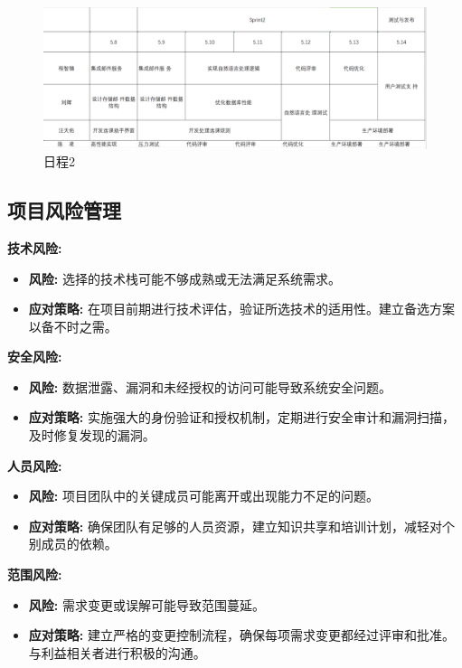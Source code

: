 \documentclass{article}
\begin{document}
	\begin{figure}[h]
	\centering
	\includegraphics[width=\textwidth]{日程2.png}
	\caption{日程2}
	\label{fig:schedule2}
\end{figure}

\subsection{项目风险管理}
\textbf{技术风险:}
\begin{itemize}
    \item \textbf{风险:} 选择的技术栈可能不够成熟或无法满足系统需求。
    \item \textbf{应对策略:} 在项目前期进行技术评估，验证所选技术的适用性。建立备选方案以备不时之需。
\end{itemize}

\textbf{安全风险:}
\begin{itemize}
    \item \textbf{风险:} 数据泄露、漏洞和未经授权的访问可能导致系统安全问题。
    \item \textbf{应对策略:} 实施强大的身份验证和授权机制，定期进行安全审计和漏洞扫描，及时修复发现的漏洞。
\end{itemize}

\textbf{人员风险:}
\begin{itemize}
    \item \textbf{风险:} 项目团队中的关键成员可能离开或出现能力不足的问题。
    \item \textbf{应对策略:} 确保团队有足够的人员资源，建立知识共享和培训计划，减轻对个别成员的依赖。
\end{itemize}

\textbf{范围风险:}
\begin{itemize}
    \item \textbf{风险:} 需求变更或误解可能导致范围蔓延。
    \item \textbf{应对策略:} 建立严格的变更控制流程，确保每项需求变更都经过评审和批准。与利益相关者进行积极的沟通。
\end{itemize}
\end{document}
